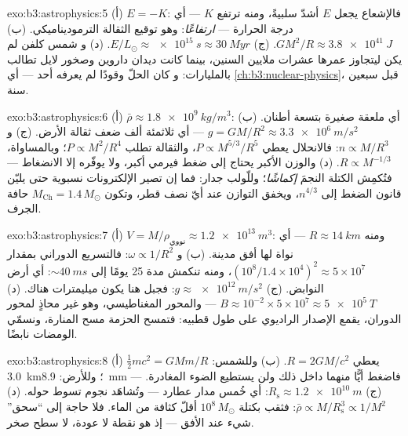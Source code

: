 \begin{solution}{exo:b3:astrophysics:5}
(أ) $E = -K$: فالإشعاع يجعل $E$ أشدّ سلبيةً، ومنه ترتفع $K$ ---
أي درجة الحرارة --- \emph{ارتفاعًا}: وهو توقيع الثقالة
الترموديناميكي. (ب) $GM^2/R \approx \qty{3.8e41}{J}$. (ج)
$E/L_\odot \approx \qty{e15}{s} \approx \qty{30}{Myr}$. (د) و
شمس كلفن لم يكن ليتجاوز عمرها عشرات ملايين السنين، بينما
كانت ديدان داروين وصخور لايل تطالب بالمليارات: و
كان الحلّ وقودًا لم يعرفه أحد --- أي \cref{ch:b3:nuclear-physics}،
قبل سبعين سنة.
\end{solution}

\begin{solution}{exo:b3:astrophysics:6}
(أ) $\bar\rho \approx \qty{1.8e9}{kg/m^3}$: أي ملعقة صغيرة
بتسعة أطنان. (ب) $g = GM/R^2 \approx \qty{3.3e6}{m/s^2}$ --- أي ثلاثمئة
ألف ضعف ثقالة الأرض. (ج) و $n \propto M/R^3$:
فالانحلال يعطي $P \propto M^{5/3}/R^5$، والثقالة تطلب
$P \propto M^2/R^4$؛ وبالمساواة، $R \propto M^{-1/3}$. (د) والوزن
الأكبر يحتاج إلى ضغط فيرمي أكبر، ولا يوفّره إلا الانضغاط
--- فتُكمِش الكتلة النجمَ \emph{إكماشًا}؛ وللّولب
جدار: فما إن تصير الإلكترونات نسبوية حتى يليّن قانون الضغط إلى
$n^{4/3}$، ويخفق التوازن عند أيّ نصف قطر، وتكون
$M_{\text{Ch}} = 1.4\,M_\odot$ حافة الجرف.
\end{solution}

\begin{solution}{exo:b3:astrophysics:7}
(أ) $V = M/\rho_{\text{نووي}} \approx \qty{1.2e13}{m^3}$:
ومنه $R \approx \qty{14}{km}$ --- أي نواة لها أفق مدينة. (ب)
و $\omega \propto 1/R^2$: فالتسريع الدوراني بمقدار $(10^8/1.4\times10^4)^2
\approx 5\times10^{7}$، ومنه تنكمش مدة 25 يومًا إلى
${\sim}\qty{40}{ms}$: أي أرض النوابض. (ج) $g \approx
\qty{e12}{m/s^2}$: فجبل هنا يكون ميليمترات هناك.
(د) $B \approx 10^{-2}\times5\times10^{7} \approx
\qty{5e5}{T}$ --- والمحور المغناطيسي، وهو غير محاذٍ لمحور
الدوران، يقمع الإصدار الراديوي على طول قطبيه: فتمسح الحزمة
مسح المنارة، ونسمّي الومضات نابضًا.
\end{solution}

\begin{solution}{exo:b3:astrophysics:8}
(أ) $\tfrac12mc^2 = GMm/R$ يعطي $R = 2GM/c^2$. (ب) وللشمس:
\qty{3.0}{km}؛ وللأرض: \qty{8.9}{mm} --- فاضغط أيًّا منهما داخل
ذلك ولن يستطيع الضوء المغادرة. (ج) $R_{\text{s}} \approx
\qty{1.2e10}{m}$: أي خُمس مدار عطارد --- وتُشاهَد نجوم
تسوط حوله. (د) $\bar\rho \propto
M/R_{\text{s}}^3 \propto 1/M^2$: فثقب بكتلة $10^8\,M_\odot$ أقلّ
كثافة من الماء. فلا حاجة إلى ``سحق'' شيء عند الأفق ---
إذ هو نقطة لا عودة، لا سطح صخر.
\end{solution}

